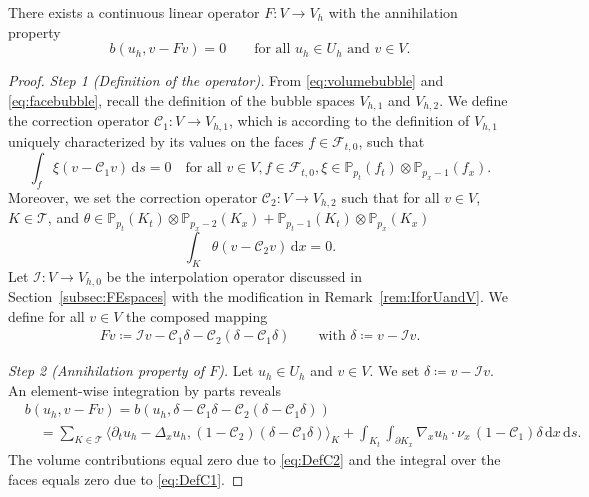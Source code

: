 \documentclass{amsart}
\providecommand{\tria}{\mathcal{T}}
\providecommand{\dx}{\,\mathrm{d}x}
\providecommand{\ds}{\,\mathrm{d}s}
\begin{document}
\begin{theorem}\label{thm:FortinOperator}
There exists a continuous linear operator $F\colon V \to V_h$ with the annihilation property
\begin{equation*}
b(u_h,v - F v) = 0\qquad\text{for all }u_h\in U_h\text{ and }v\in V.
\end{equation*}
\end{theorem}
\begin{proof}
\textit{Step 1 (Definition of the operator).}
From \eqref{eq:volumebubble} and  \eqref{eq:facebubble}, recall the definition of the bubble spaces $V_{h,1}$ and $V_{h,2}$.
We define the correction operator $\mathcal{C}_1 \colon V \to V_{h,1}$, which is according to the definition of $V_{h,1}$ uniquely characterized by its values on the faces $f\in \mathcal{F}_{t,0}$, such that
\begin{equation}\label{eq:DefC1}
\int_f \xi (v- \mathcal{C}_1 v)\ds = 0 \quad\text{for all }v\in V, f\in \mathcal{F}_{t,0}, \xi \in \mathbb{P}_{p_t}(f_t)\otimes \mathbb{P}_{p_x-1}(f_x).
\end{equation}
%
Moreover, we set the correction operator $\mathcal{C}_2 \colon V \to V_{h,2}$ such that for all $v\in V$, $K\in \tria$, and $\theta \in \mathbb{P}_{p_t}(K_t) \otimes \mathbb{P}_{p_x-2}(K_x) + \mathbb{P}_{p_t-1}(K_t) \otimes \mathbb{P}_{p_x}(K_x)$
\begin{equation}\label{eq:DefC2}
\int_K \theta (v-\mathcal{C}_2 v) \dx = 0.
\end{equation}
%
Let $\mathcal{I} \colon V \to V_{h,0}$ be the interpolation operator discussed in Section~\ref{subsec:FEspaces} with the modification in Remark~\ref{rem:IforUandV}.
We define for all $v\in V$ the composed mapping
\begin{align*}
F v \coloneqq \mathcal{I} v - \mathcal{C}_1 \delta - \mathcal{C}_2 ( \delta - \mathcal{C}_1 \delta )\qquad\text{with }\delta \coloneqq v - \mathcal{I} v.
\end{align*}

\textit{Step 2 (Annihilation property of $F$).}
Let $u_h \in U_h$ and $v \in V$.
We set $\delta \coloneqq v - \mathcal{I} v$. An element-wise integration by parts reveals
\begin{align*}
&b(u_h,v-Fv) = b(u_h,\delta -\mathcal{C}_1 \delta - \mathcal{C}_2 ( \delta - \mathcal{C}_1 \delta ))\\
&\quad = \sum_{K\in\tria} \langle \partial_t u_h-\Delta_x u_h ,(1- \mathcal{C}_2)(\delta - \mathcal{C}_1 \delta)\rangle_K + \int_{K_t} \int_{\partial K_x} \nabla_x u_h \cdot \nu_x\,  (1 - \mathcal{C}_1 ) \delta\dx \ds.
\end{align*}
The volume contributions equal zero due to \eqref{eq:DefC2} and the integral over the faces equals zero due to \eqref{eq:DefC1}.


\end{proof}
\end{document}
